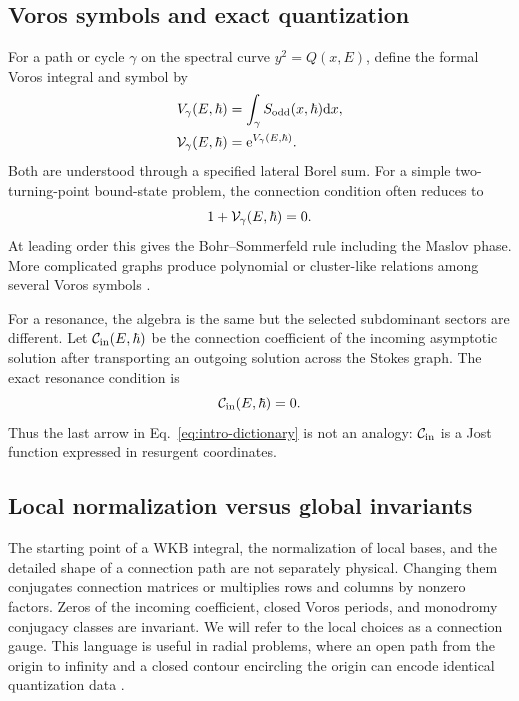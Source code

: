 \subsection{Voros symbols and exact quantization}
\label{subsec:voros-symbols}

For a path or cycle $\gamma$ on the spectral curve $y^2=Q(x,E)$, define the
formal Voros integral and symbol by
\begin{align}
  V_{\gamma}(E,\hbar)
  &=\int_{\gamma}S_{\mathrm{odd}}(x,\hbar)\mathrm{d} x,
  \notag\\
  \mathcal{V}_{\gamma}(E,\hbar)
  &=\mathrm{e}^{V_{\gamma}(E,\hbar)} .
  \label{eq:voros-symbol}
\end{align}
Both are understood through a specified lateral Borel sum.  For a simple
two-turning-point bound-state problem, the connection condition often reduces
to
\begin{equation}
  1+\mathcal{V}_{\gamma}(E,\hbar)=0 .
  \label{eq:simple-exact-quantization}
\end{equation}
At leading order this gives the Bohr--Sommerfeld rule including the Maslov
phase.  More complicated graphs produce polynomial or cluster-like relations
among several Voros symbols
\cite{Voros:1983xx,Delabaere:1999xx,Iwaki:2014vad}.

For a resonance, the algebra is the same but the selected subdominant sectors
are different.  Let $\mathcal{C}_{\mathrm{in}}(E,\hbar)$ be the connection coefficient
of the incoming asymptotic solution after transporting an outgoing solution
across the Stokes graph.  The exact resonance condition is
\begin{equation}
  \mathcal{C}_{\mathrm{in}}(E,\hbar)=0 .
  \label{eq:exact-resonance-condition}
\end{equation}
Thus the last arrow in Eq.~\eqref{eq:intro-dictionary} is not an analogy:
$\mathcal{C}_{\mathrm{in}}$ is a Jost function expressed in resurgent coordinates.

\subsection{Local normalization versus global invariants}
\label{subsec:wkb-gauge}

The starting point of a WKB integral, the normalization of local bases, and
the detailed shape of a connection path are not separately physical.  Changing
them conjugates connection matrices or multiplies rows and columns by nonzero
factors.  Zeros of the incoming coefficient, closed Voros periods, and
monodromy conjugacy classes are invariant.  We will refer to the local choices
as a connection gauge.  This language is useful in radial problems, where an
open path from the origin to infinity and a closed contour encircling the
origin can encode identical quantization data
\cite{Morikawa:2025ezl}.
